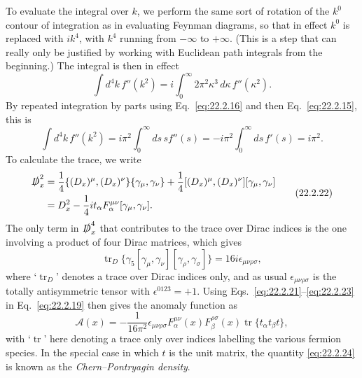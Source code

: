 To evaluate the integral over $k$, we perform the same sort of rotation of
the $k^0$ contour of integration as in evaluating Feynman diagrams, so that
in effect $k^0$ is replaced with $ik^4$, with $k^4$ running from $-\infty$
to $+\infty$. (This is a step that can really only be justified by working
with Euclidean path integrals from the beginning.) The integral is then in
effect
\begin{equation}
 \int d^4k\,f''(k^2)
 =i\int_0^\infty 2\pi^2\kappa^3\,d\kappa\,f''(\kappa^2).
 \tag{22.2.20}\label{eq:22.2.20}
\end{equation}
By repeated integration by parts using Eq.~\eqref{eq:22.2.16} and then
Eq.~\eqref{eq:22.2.15}, this is
\begin{equation}
 \int d^4k\,f''(k^2)
 =i\pi^2\int_0^\infty ds\,s f''(s)
 =-i\pi^2\int_0^\infty ds\,f'(s)
 =i\pi^2.
 \tag{22.2.21}\label{eq:22.2.21}
\end{equation}
To calculate the trace, we write
\begin{equation}
 \begin{aligned}
 \sl{D}_x^2
 &=\frac14\{(D_x)^\mu,(D_x)^\nu\}\{\gamma_\mu,\gamma_\nu\}
 +\frac14[(D_x)^\mu,(D_x)^\nu][\gamma_\mu,\gamma_\nu]\\
 &=D_x^2-\frac14it_\alpha F_\alpha^{\mu\nu}
 [\gamma_\mu,\gamma_\nu].
 \end{aligned}
 \tag{22.2.22}\label{eq:22.2.22}
\end{equation}
The only term in $\sl{D}_x^4$ that contributes to the trace over Dirac
indices is the one involving a product of four Dirac matrices, which gives
\begin{equation}
 \operatorname{tr}_{D}\{\gamma_5
 [\gamma_\mu,\gamma_\nu][\gamma_\rho,\gamma_\sigma]\}
 =16i\epsilon_{\mu\nu\rho\sigma},
 \tag{22.2.23}\label{eq:22.2.23}
\end{equation}
where `$\operatorname{tr}_{D}$' denotes a trace over Dirac indices only,
and as usual $\epsilon_{\mu\nu\rho\sigma}$ is the totally antisymmetric
tensor with $\epsilon^{0123}=+1$. Using
Eqs.~\eqref{eq:22.2.21}--\eqref{eq:22.2.23} in Eq.~\eqref{eq:22.2.19}
then gives the anomaly function as
\begin{equation}
 \mathcal A(x)=-\frac{1}{16\pi^2}\epsilon_{\mu\nu\rho\sigma}
 F_\alpha^{\mu\nu}(x)F_\beta^{\rho\sigma}(x)
 \operatorname{tr}\{t_\alpha t_\beta t\},
 \tag{22.2.24}\label{eq:22.2.24}
\end{equation}
with `$\operatorname{tr}$' here denoting a trace only over indices
labelling the various fermion species. In the special case in which $t$ is
the unit matrix, the quantity \eqref{eq:22.2.24} is known as the
\emph{Chern--Pontryagin density}.

